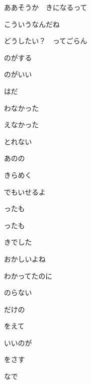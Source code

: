 \documentclass[a4paper,tate,twocolumn,12pt]{ltjtarticle}
\begin{document}
\begin{flushleft}
\begin{minipage}{\linewidth}
ああそうか　きになるって

こういうなんだね
\end{minipage}

\vspace{2em}

\noindent\begin{minipage}{\linewidth}
どうしたい？　ってごらん

のがする

のがいい

はだ
\end{minipage}

\vspace{2em}

\noindent\begin{minipage}{\linewidth}
わなかった

えなかった

とれない
\end{minipage}

\vspace{2em}

\noindent\begin{minipage}{\linewidth}
あのの

きらめく

でもいせるよ

ったも

ったも

きでした
\end{minipage}

\vspace{2em}

\noindent\begin{minipage}{\linewidth}
おかしいよね

わかってたのに

のらない

だけの
\end{minipage}

\vspace{2em}

\noindent\begin{minipage}{\linewidth}
をえて

いいのが

をさす

なで
\end{minipage}

\end{flushleft}
\end{document}

